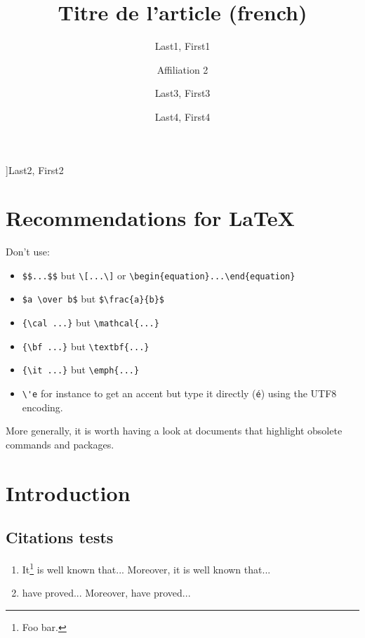 \documentclass[french]{nwejmart}
\begin{document}
\nocite{*} %
%
\title{Titre de l'article (french)}
\author[affiliation={Affiliation 1}]{Last1, First1}
\author[affiliation=[aff2]{Affiliation 2}]{Last2, First2}
\author[affiliation={Affiliation 3},affiliation={Affiliation 3 bis}]{Last3, First3}
\author[affiliation={Affiliation 4},affiliationtagged={aff2}]{Last4, First4}
%
\begin{abstract}
  \lipsum[1]
\end{abstract}
%
%
%
%
\maketitle
%
\section*{Recommendations for \LaTeX}
Don't use:
\begin{itemize}
\item \verb+$$...$$+ but \verb+\[...\]+ or \verb+\begin{equation}...\end{equation}+
\item \verb+$a \over b$+ but \verb+$\frac{a}{b}$+
\item \verb+{\cal ...}+ but \verb+\mathcal{...}+
\item \verb+{\bf ...}+ but \verb+\textbf{...}+
\item \verb+{\it ...}+ but \verb+\emph{...}+
\item \verb+\'e+ for instance to get an accent but type it directly (\verb+é+)
  using the UTF8 encoding.
\end{itemize}
More generally, it is worth having a look at documents that highlight obsolete
commands and
packages\autocite{ensenbach2016,ensenbach2011,trettin2007,ensenbach2011a,trettin2007a}.
%
\section*{Introduction}
%
\subsection{Citations tests}
\begin{enumerate}
  \item It\footnote{Foo bar.} is well known\autocite{baez/article}
    that... Moreover, it is well known\autocite{companion} that...
  \item \textcite{baez/article} have proved... Moreover, \textcite{companion}
    have proved...
\end{enumerate}
%
\end{document}
